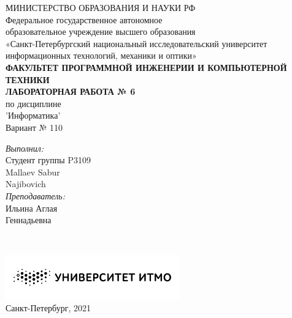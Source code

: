 {\centering
МИНИСТЕРСТВО ОБРАЗОВАНИЯ И НАУКИ РФ \\
\vspace{0.6cm}
Федеральное государственное автономное \\
образовательное учреждение высшего образования \\
«Санкт-Петербургский национальный исследовательский университет \\
 информационных технологий, механики и оптики» \\
\vspace{0.6cm}
\footnotesize{\textbf{ФАКУЛЬТЕТ ПРОГРАММНОЙ ИНЖЕНЕРИИ И КОМПЬЮТЕРНОЙ ТЕХНИКИ}} \\
\vspace{3.2cm}
\Large{\textbf{ЛАБОРАТОРНАЯ РАБОТА № 6}} \\
\large{по дисциплине} \\
\Large{'Информатика'} \\
\vspace{1cm}
\Large{Вариант № 110} \\
\vspace{9cm}
\begin{minipage}{\linewidth}
\raggedleft
\normalsize
\textsl{Выполнил:} \\
Студент группы P3109 \\
Mallaev Sabur  \\ Najibovich \\
\textsl{Преподаватель:} \\
Ильина Аглая \\ Геннадьевна
\end{minipage} \\
\vspace{2cm}
\begin{minipage}{\linewidth}
\centering
\includegraphics[width=7.5cm]{images/logo.png} \\
\normalsize{Санкт-Петербург, 2021} \\
\end{minipage} \\}